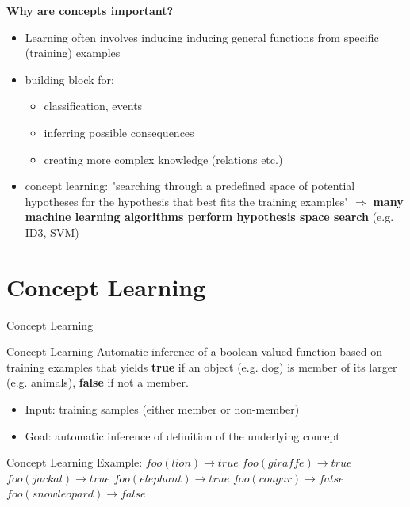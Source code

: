 \documentclass{beamer}
\begin{document}
\begin{frame}
\textbf{Why are concepts important?}
\begin{itemize}
\item Learning often involves inducing inducing general functions from specific (training) examples %
\item building block for: 
	\begin{itemize}
		\item classification, events
        \item inferring possible consequences
        \item creating more complex knowledge (relations etc.)
	\end{itemize}
\item concept learning: "searching through a predefined space of potential hypotheses for the hypothesis that best fits the training examples" \cite{mitchell1997a}
$\Rightarrow$ \textbf{many machine learning algorithms perform hypothesis space search} (e.g. ID3, SVM)
\end{itemize}

\end{frame}


\section{Concept Learning}
\begin{frame}{Concept Learning}

\begin{block}{Concept Learning}
Automatic inference of a boolean-valued function based on training examples that yields \textbf{true} if an object (e.g. dog) is member of its larger  (e.g. animals), \textbf{false} if not a member.
\end{block}
\begin{itemize}
\item Input: training samples (either member or non-member)
\item Goal: automatic inference of definition of the underlying concept 
\end{itemize}
\end{frame}

\begin{frame}{Concept Learning}
Example:\newline
$foo(lion) \rightarrow true $\newline
$foo(giraffe) \rightarrow true $\newline
$foo(jackal) \rightarrow true $\newline
$foo(elephant) \rightarrow true $\newline
$foo(cougar) \rightarrow false $\newline
$foo(snow leopard) \rightarrow false $\newline
\end{frame}
\end{document}
